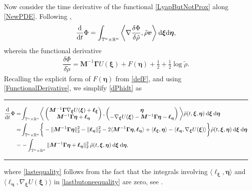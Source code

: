 \documentclass[10pt,twocolumn]{IEEEtran}
\newcommand{\differential}{{\rm{d}}}
\begin{document}
Now consider the time derivative of the functional \eqref{LyapButNotProx} along \eqref{NewPDE}. Following \cite[Proposition 1]{krichene2020global}, 
\begin{align}
\frac{\differential}{\differential t}\Phi = \displaystyle\int_{\mathbb{T}^{n}\times\mathbb{R}^{n}} \bigg\langle\nabla\dfrac{\delta\Phi}{\delta\tilde{\rho}}, \tilde{\rho}\bm{v}\bigg\rangle\:\differential\bm{\xi}\differential\bm{\eta},
\label{dPhidt}	
\end{align}
wherein the functional derivative
\begin{align}
\dfrac{\delta\Phi}{\delta\tilde{\rho}}	= \!\bm{M}^{-1}\bm{\Gamma}U(\bm{\xi})+ F\left(\bm{\eta}\right) + \frac{1}{2} + \frac{1}{2}\log\tilde{\rho}.
\label{FunctionalDerivative}
\end{align}
Recalling the explicit form of $F(\bm{\eta})$ from \eqref{defF}, and using \eqref{FunctionalDerivative}, we simplify \eqref{dPhidt} as
\begin{strip}
\hrule
\begin{subequations}
\begin{align}
\frac{\differential}{\differential t}\Phi &= \!\displaystyle\int_{\mathbb{T}^{n}\times\mathbb{R}^{n}}\!\bigg\langle\begin{pmatrix}
\bm{M}^{-1}\bm{\Gamma}\nabla_{\bm{\xi}}U(\bm{\xi}) + \bm{\ell}_{\bm{\xi}}\\
\bm{M}^{-1}\bm{\Gamma}\bm{\eta} + \bm{\ell}_{\bm{\eta}}	
\end{pmatrix}, \begin{pmatrix}
 \bm{\eta}\\
 -\nabla_{\bm{\xi}}U(\bm{\xi}) - \bm{M}^{-1}\bm{\Gamma}\bm{\eta} - \bm{\ell}_{\bm{\eta}}	
 \end{pmatrix}\bigg\rangle\tilde{\rho}(t,\bm{\xi},\bm{\eta})\:\differential\bm{\xi}\:\differential\bm{\eta}	\label{firstequality}\\
&= \!\displaystyle\int_{\mathbb{T}^{n}\times\mathbb{R}^{n}}\!\bigg\{-\|\bm{M}^{-1}\bm{\Gamma}\bm{\eta}\|_{2}^{2} - \|\bm{\ell}_{\bm{\eta}}\|_{2}^{2} - 2\langle \bm{M}^{-1}\bm{\Gamma}\bm{\eta},\bm{\ell}_{\bm{\eta}}\rangle + \langle \bm{\ell}_{\bm{\xi}},\bm{\eta}\rangle - \langle\bm{\ell}_{\bm{\eta}},\nabla_{\bm{\xi}}U(\bm{\xi})\rangle\bigg\}\tilde{\rho}(t,\bm{\xi},\bm{\eta})\:\differential\bm{\xi}\:\differential\bm{\eta} \label{lastbutoneequality}\\
&= -\displaystyle\int_{\mathbb{T}^{n}\times\mathbb{R}^{n}}\|\bm{M}^{-1}\bm{\Gamma}\bm{\eta} + \bm{\ell}_{\bm{\eta}}\|_{2}^{2}\:\tilde{\rho}(t,\bm{\xi},\bm{\eta})\:\differential\bm{\xi} \:\differential\bm{\eta}, \label{lastequality}
\end{align}
\label{ExplicitdPhidt}	
\end{subequations}
\hrule	
\end{strip}
where \eqref{lastequality} follows from the fact that the integrals involving $\langle \bm{\ell}_{\bm{\xi}},\bm{\eta}\rangle$ and $\langle\bm{\ell}_{\bm{\eta}},\nabla_{\bm{\xi}}U(\bm{\xi})\rangle$ in \eqref{lastbutoneequality} are zero, see \cite[Appendix D.3]{krichene2020global}.
\end{document}
